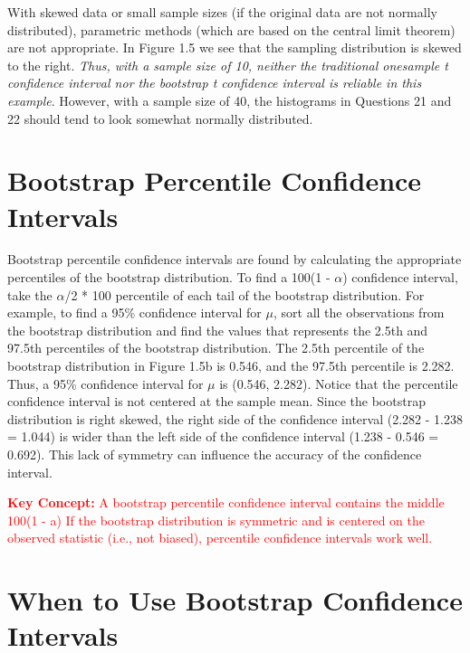 \documentclass[
]{report}
\theoremstyle{definition}
\theoremstyle{definition}
\theoremstyle{definition}
\theoremstyle{definition}
\theoremstyle{remark}
\begin{document}
\normalsize

With skewed data or small sample sizes (if the original data are not normally distributed), parametric
methods (which are based on the central limit theorem) are not appropriate. In Figure 1.5 we see that the
sampling distribution is skewed to the right. \emph{Thus, with a sample size of 10, neither the traditional onesample
t confidence interval nor the bootstrap t confidence interval is reliable in this example}. However,
with a sample size of 40, the histograms in Questions 21 and 22 should tend to look somewhat normally
distributed.

\hypertarget{bootstrap-percentile-confidence-intervals}{%
\section*{Bootstrap Percentile Confidence Intervals}\label{bootstrap-percentile-confidence-intervals}}

Bootstrap percentile confidence intervals are found by calculating the appropriate percentiles of the bootstrap distribution. To find a 100(1 - \(\alpha\)) confidence interval, take the \(\alpha\)/2 * 100 percentile of each tail of the bootstrap distribution. For example, to find a 95\% confidence interval for \(\mu\), sort all the observations from the bootstrap distribution and find the values that represents the 2.5th and 97.5th percentiles of the bootstrap distribution. The
2.5th percentile of the bootstrap distribution in Figure 1.5b is 0.546, and the 97.5th percentile is 2.282. Thus,
a 95\% confidence interval for \(\mu\) is (0.546, 2.282).
Notice that the percentile confidence interval is not centered at the sample mean. Since the bootstrap
distribution is right skewed, the right side of the confidence interval (2.282 - 1.238 = 1.044) is wider than
the left side of the confidence interval (1.238 - 0.546 = 0.692). This lack of symmetry can influence the
accuracy of the confidence interval.

\Large

\textbf{\textcolor{red}{Key Concept:}}
\textcolor{red}{A bootstrap percentile confidence interval contains the middle 100(1 - a)%
If the bootstrap distribution is symmetric and is centered on the observed statistic (i.e., not biased),
percentile confidence intervals work well.}

\normalsize

\hypertarget{when-to-use-bootstrap-confidence-intervals}{%
\section*{When to Use Bootstrap Confidence Intervals}\label{when-to-use-bootstrap-confidence-intervals}}
\end{document}
